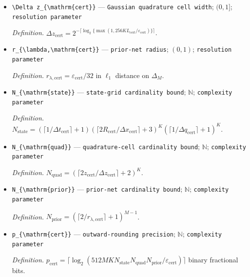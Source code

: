 \documentclass{article}
\begin{document}
\begin{itemize}
  \item \texttt{\textbackslash{}\allowbreak{}Delta z\_\allowbreak{}\{\textbackslash{}\allowbreak{}mathrm\{cert\}\allowbreak{}\}\allowbreak{}} --- \texttt{Gaussian quadrature cell width}; \((0,1]\); \texttt{resolution parameter}
  \par\smallskip\noindent\emph{Definition.} \(\Delta z_{\mathrm{cert}}=2^{-\lceil\log_2\{\max(1,256KL_{\mathrm{cert}}/\varepsilon_{\mathrm{cert}})\}\rceil}\).
  \item \texttt{r\_\allowbreak{}\{\textbackslash{}\allowbreak{}lambda,\allowbreak{}\textbackslash{}\allowbreak{}mathrm\{cert\}\allowbreak{}\}\allowbreak{}} --- \texttt{prior-\allowbreak{}net radius}; \((0,1)\); \texttt{resolution parameter}
  \par\smallskip\noindent\emph{Definition.} \(r_{\lambda,\mathrm{cert}}=\varepsilon_{\mathrm{cert}}/32\) in \(\ell_1\) distance on \(\Delta_M\).
  \item \texttt{N\_\allowbreak{}\{\textbackslash{}\allowbreak{}mathrm\{state\}\allowbreak{}\}\allowbreak{}} --- \texttt{state-\allowbreak{}grid cardinality bound}; \(\mathbb N\); \texttt{complexity parameter}
  \par\smallskip\noindent\emph{Definition.} \(N_{\mathrm{state}}=(\lceil1/\Delta t_{\mathrm{cert}}\rceil+1)(\lceil2R_{\mathrm{cert}}/\Delta x_{\mathrm{cert}}\rceil+3)^K(\lceil1/\Delta q_{\mathrm{cert}}\rceil+1)^K\).
  \item \texttt{N\_\allowbreak{}\{\textbackslash{}\allowbreak{}mathrm\{quad\}\allowbreak{}\}\allowbreak{}} --- \texttt{quadrature-\allowbreak{}cell cardinality bound}; \(\mathbb N\); \texttt{complexity parameter}
  \par\smallskip\noindent\emph{Definition.} \(N_{\mathrm{quad}}=(\lceil2z_{\mathrm{cert}}/\Delta z_{\mathrm{cert}}\rceil+2)^K\).
  \item \texttt{N\_\allowbreak{}\{\textbackslash{}\allowbreak{}mathrm\{prior\}\allowbreak{}\}\allowbreak{}} --- \texttt{prior-\allowbreak{}net cardinality bound}; \(\mathbb N\); \texttt{complexity parameter}
  \par\smallskip\noindent\emph{Definition.} \(N_{\mathrm{prior}}=(\lceil2/r_{\lambda,\mathrm{cert}}\rceil+1)^{M-1}\).
  \item \texttt{p\_\allowbreak{}\{\textbackslash{}\allowbreak{}mathrm\{cert\}\allowbreak{}\}\allowbreak{}} --- \texttt{outward-\allowbreak{}rounding precision}; \(\mathbb N\); \texttt{complexity parameter}
  \par\smallskip\noindent\emph{Definition.} \(p_{\mathrm{cert}}=\lceil\log_2(512MKN_{\mathrm{state}}N_{\mathrm{quad}}N_{\mathrm{prior}}/\varepsilon_{\mathrm{cert}})\rceil\) binary fractional bits.

\end{itemize}
\end{document}
